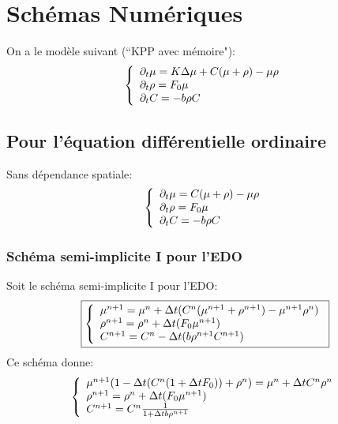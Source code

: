 \section{Schémas Numériques}
On a le modèle suivant (``KPP avec mémoire"): 
\begin{equation} \left\{
                \begin{array}{ll}
                   \partial_t\mu = K\Delta\mu + C(\mu + \rho) -\mu\rho\\
                 \partial_t\rho=  F_0 \mu \\
                  \partial_t C = -b\rho C
                \end{array}
              \right.
\end{equation}
\subsection{Pour l'équation différentielle ordinaire}
Sans dépendance spatiale:
\begin{equation} \left\{
                \begin{array}{ll}
                   \partial_t\mu = C(\mu + \rho) -\mu\rho\\
                 \partial_t\rho=  F_0 \mu \\
                  \partial_t C = -b\rho C
                \end{array}
              \right.
\end{equation} 
\subsubsection{Schéma semi-implicite I pour l'EDO}
Soit le schéma semi-implicite I pour l'EDO:
\begin{equation} \boxed{\left\{
                \begin{array}{ll}
                   \mu^{n+1} = \mu^{n}+  \Delta t( C^{n}(\mu^{n+1} + \rho^{n+1}) -\mu^{n+1}\rho^{n})\\
                \rho^{n+1}=  \rho^{n}+ \Delta t (F_0 \mu^{n+1}) \\
                 C^{n+1} =C^{n}- \Delta t(b\rho^{n+1}C^{n+1})
                \end{array}
              \right.}
\end{equation}
Ce schéma donne:
\begin{equation*} \left\{
                \begin{array}{ll}
                   \mu^{n+1}(1-\Delta t(C^{n}(1+\Delta t F_0)) + \rho^{n}) = \mu^{n}+  \Delta t C^{n}\rho^{n} \\
                \rho^{n+1}=  \rho^{n}+ \Delta t (F_0 \mu^{n+1}) \\
                 C^{n+1} =C^{n}\frac{1}{1+ \Delta t b\rho^{n+1}}
                \end{array}
              \right.
\end{equation*}
